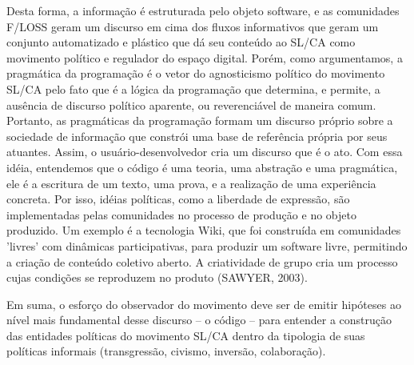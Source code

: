 Desta forma, a informação é estruturada pelo objeto software, e as comunidades F/LOSS geram um discurso em cima dos fluxos informativos que geram um conjunto automatizado e plástico que dá seu conteúdo ao SL/CA como movimento político e regulador do espaço digital. Porém, como argumentamos, a pragmática da programação é o vetor do agnosticismo político do movimento SL/CA pelo fato que é a lógica da programação que determina, e permite, a ausência de discurso político aparente, ou reverenciável de maneira comum. Portanto, as pragmáticas da programação formam um discurso próprio sobre a sociedade de informação que constrói uma base de referência própria por seus atuantes.  Assim, o usuário-desenvolvedor cria um discurso que é o ato. Com essa idéia, entendemos que o código é uma teoria, uma abstração e uma pragmática, ele é a escritura de um texto, uma prova, e a realização de uma experiência concreta. Por isso, idéias políticas, como a liberdade de expressão, são implementadas pelas comunidades no processo de produção e no objeto produzido. Um exemplo é a tecnologia Wiki, que foi construída em comunidades 'livres' com dinâmicas participativas, para produzir um software livre, permitindo a criação de conteúdo coletivo aberto. A criatividade de grupo cria um processo cujas condições se reproduzem no produto (SAWYER, 2003).

Em suma, o esforço do observador do movimento deve ser de emitir hipóteses ao nível mais fundamental desse discurso – o código – para entender a construção das entidades políticas do movimento SL/CA dentro da tipologia de suas políticas informais (transgressão, civismo, inversão, colaboração). 
